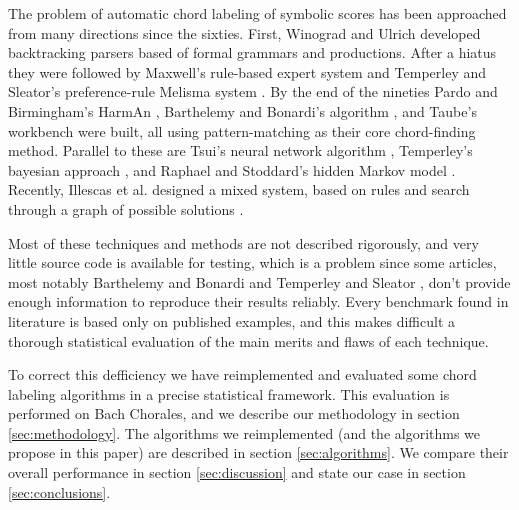 \documentclass{article}
\begin{document}
The problem of automatic chord labeling of symbolic scores has been
approached from many directions since the sixties. First, Winograd
\cite{winograd68:linguistics} and Ulrich \cite{ulrich77:analysis}
developed backtracking parsers based of formal grammars and
productions. After a hiatus they were followed by Maxwell's
\cite{maxwell92:expert} rule-based expert system and Temperley and
Sleator's preference-rule Melisma system
\cite{temperley.ea99:modeling}. By the end of the nineties Pardo and
Birmingham's HarmAn \cite{barthelemy.ea01:figured}, Barthelemy and
Bonardi's algorithm \cite{pardo.ea02:algorithms}, and Taube's
workbench \cite{taube99:automatic} were built, all using
pattern-matching as their core chord-finding method. Parallel to these
are Tsui's neural network algorithm \cite{tsui02:harmonic}, Temperley's
bayesian approach \cite{temperley04:bayesian}, and Raphael and
Stoddard's hidden Markov model \cite{raphael.ea03:harmonic}. Recently,
Illescas et al. designed a mixed system, based on rules and search
through a graph of possible solutions \cite{illescas.ea07:harmonic}.

Most of these techniques and methods are not described rigorously, and
very little source code is available for testing, which is a problem
since some articles, most notably Barthelemy and Bonardi
\cite{pardo.ea02:algorithms} and Temperley and Sleator
\cite{temperley.ea99:modeling}, don't provide enough information to
reproduce their results reliably. Every benchmark found in literature
\cite{pardo.ea00:automated, pardo.ea02:algorithms, tsui02:harmonic,
  taube99:automatic, illescas.ea07:harmonic} is based only on
published examples, and this makes difficult a thorough statistical
evaluation of the main merits and flaws of each technique.

To correct this defficiency we have reimplemented and evaluated some
chord labeling algorithms in a precise statistical framework. This
evaluation is performed on Bach Chorales, and we describe our
methodology in section \ref{sec:methodology}. The algorithms we
reimplemented (and the algorithms we propose in this paper) are
described in section \ref{sec:algorithms}. We compare their overall
performance in section \ref{sec:discussion} and state our case in
section \ref{sec:conclusions}.
\end{document}
